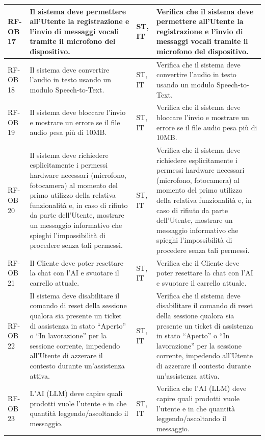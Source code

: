 \documentclass[a4paper,11pt,oneside]{scrartcl}
\begin{document}
\begin{longtable}{|p{1.5cm}|p{4.5cm}|p{1.8cm}|p{6cm}|}
RF-OB 17 & Il sistema deve permettere all'Utente la registrazione e l'invio di messaggi vocali tramite il microfono del dispositivo. & ST, IT & Verifica che il sistema deve permettere all'Utente la registrazione e l'invio di messaggi vocali tramite il microfono del dispositivo. \\ \hline
RF-OB 18 & Il sistema deve convertire l'audio in testo usando un modulo Speech-to-Text. & ST, IT & Verifica che il sistema deve convertire l'audio in testo usando un modulo Speech-to-Text. \\ \hline
RF-OB 19 & Il sistema deve bloccare l'invio e mostrare un errore se il file audio pesa più di 10MB. & ST, IT & Verifica che il sistema deve bloccare l'invio e mostrare un errore se il file audio pesa più di 10MB. \\ \hline
RF-OB 20 & Il sistema deve richiedere esplicitamente i permessi hardware necessari (microfono, fotocamera) al momento del primo utilizzo della relativa funzionalità e, in caso di rifiuto da parte dell'Utente, mostrare un messaggio informativo che spieghi l'impossibilità di procedere senza tali permessi. & ST, IT & Verifica che il sistema deve richiedere esplicitamente i permessi hardware necessari (microfono, fotocamera) al momento del primo utilizzo della relativa funzionalità e, in caso di rifiuto da parte dell'Utente, mostrare un messaggio informativo che spieghi l'impossibilità di procedere senza tali permessi. \\ \hline
RF-OB 21 & Il Cliente deve poter resettare la chat con l'AI e svuotare il carrello attuale. & ST, IT & Verifica che il Cliente deve poter resettare la chat con l'AI e svuotare il carrello attuale. \\ \hline
RF-OB 22 & Il sistema deve disabilitare il comando di reset della sessione qualora sia presente un ticket di assistenza in stato ``Aperto'' o ``In lavorazione'' per la sessione corrente, impedendo all'Utente di azzerare il contesto durante un'assistenza attiva. & ST, IT & Verifica che il sistema deve disabilitare il comando di reset della sessione qualora sia presente un ticket di assistenza in stato ``Aperto'' o ``In lavorazione'' per la sessione corrente, impedendo all'Utente di azzerare il contesto durante un'assistenza attiva. \\ \hline
RF-OB 23 & L'AI (LLM) deve capire quali prodotti vuole l'utente e in che quantità leggendo/ascoltando il messaggio. & ST, IT & Verifica che l'AI (LLM) deve capire quali prodotti vuole l'utente e in che quantità leggendo/ascoltando il messaggio. \\ \hline

\end{longtable}
\end{document}
